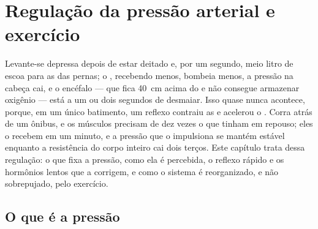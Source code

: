 \chapter{Regulação da pressão arterial e exercício}\label{ch:b2:blood-pressure}

Levante-se depressa depois de estar deitado e, por um segundo, meio
litro de  escoa para as  das pernas; o , recebendo
menos, bombeia menos, a pressão na cabeça cai, e o encéfalo --- que fica
\qty{40}{cm} acima do  e não consegue armazenar oxigênio --- está a um
ou dois segundos de desmaiar. Isso quase nunca acontece, porque, em um
único batimento, um reflexo contraiu as  e acelerou o
. Corra atrás de um ônibus, e os músculos precisam de dez vezes
o  que tinham em repouso; eles o recebem em um minuto, e a pressão
que o impulsiona se mantém estável enquanto a resistência do corpo
inteiro cai dois terços. Este capítulo trata dessa regulação: o que
fixa a pressão, como ela é percebida, o reflexo rápido e os hormônios
lentos que a corrigem, e como o sistema é reorganizado, e não
sobrepujado, pelo exercício.

\section{O que é a pressão}

